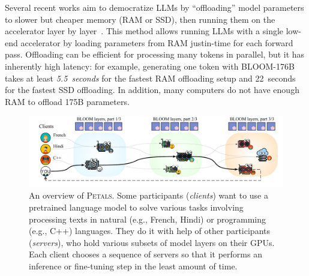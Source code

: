 Several recent works aim to democratize LLMs
by ``offloading'' model parameters to slower but cheaper memory (RAM or SSD), then running them on the accelerator layer by layer~\cite{l2l,zerooffload}\nocite{accelerate}.
This method allows running LLMs with a single low-end accelerator by loading parameters from RAM justin-time for each forward pass.
Offloading can be efficient for processing many tokens in parallel, but it has inherently high latency: for example, generating one token with BLOOM-176B takes at least \textit{5.5~seconds} for the fastest RAM offloading setup and 22~seconds for the fastest SSD offloading. In addition, many computers do not have enough RAM to offload 175B parameters.

\begin{figure}[t]
    \centering
    \vspace{-20pt}
    \includegraphics[width=\linewidth]{resources/bloom_swarm_v9.pdf}
    \vspace{-24pt}
    \caption{An overview of \textsc{Petals}. Some participants (\textit{clients}) want to use a pretrained language model to solve various tasks involving processing texts in natural (e.g., French, Hindi) or programming (e.g., C++) languages. They do it with help of other participants (\textit{servers}), who hold various subsets of model layers on their GPUs. Each client chooses a sequence of servers so that it performs an inference or fine-tuning step in the least amount of time.}
    \label{fig:overview}
    \vspace{-5pt}
\end{figure}

